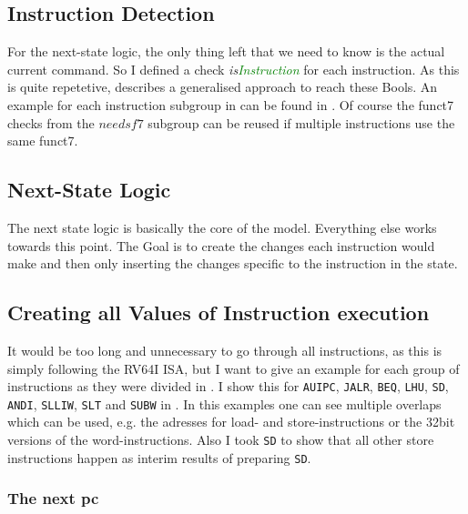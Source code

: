 \subsection{Instruction Detection}

For the next-state logic, the only thing left that we need to know is the
actual current command. So I defined a check
\textsl{is\textcolor{Green}{Instruction}} for each instruction. As this is
quite repetetive,  describes a generalised
approach to reach these Bools. An example for each instruction subgroup in
 can be found in .
Of course the funct7 checks from the $needsf7$ subgroup can be reused if
multiple instructions use the same funct7.




\subsection{Next-State Logic}
The next state logic is basically the core of the model. Everything else works
towards this point. The Goal is to create the changes each instruction would
make and then only inserting the changes specific to the instruction in the
state.

\subsection{Creating all Values of Instruction execution}
It would be too long and unnecessary to go through all instructions, as this is
simply following the RV64I ISA, but I want to give an example for each group of
instructions as they were divided in . I show
this for \texttt{AUIPC}, \texttt{JALR}, \texttt{BEQ}, \texttt{LHU},
\texttt{SD}, \texttt{ANDI}, \texttt{SLLIW}, \texttt{SLT} and \texttt{SUBW} in
. In this examples one can see multiple overlaps which
can be used, e.g. the adresses for load- and store-instructions or the 32bit
versions of the word-instructions. Also I took \texttt{SD} to show that all
other store instructions happen as interim results of preparing \texttt{SD}.



\subsubsection{The next pc}
